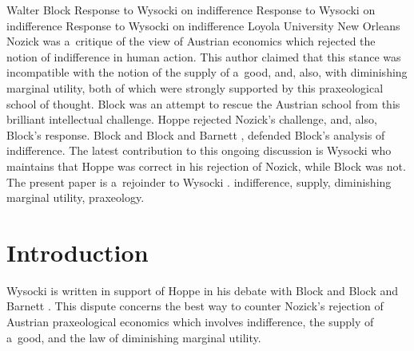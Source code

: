 \begin{artengenv}{Walter Block}
	{Response to Wysocki on indifference\footnotemark{}}
	{Response to Wysocki on indifference}
	{Response to Wysocki on indifference}
	{Loyola University New Orleans}
	{Nozick
	\parencite*{nozick_austrian_1977}
	was a~critique of the view of Austrian economics which rejected the notion of indifference in human action. This author claimed that this stance was incompatible with the notion of the supply of a~good, and, also, with diminishing marginal utility, both of which were strongly supported by this praxeological school of thought. Block
	\parencite*{block_pu1}
	was an attempt to rescue the Austrian school from this brilliant intellectual challenge. Hoppe
	\parencites*{hoppe_pu1}{hoppe_further_2009}
	rejected Nozick's challenge, and, also, Block's
	\parencite*{block_pu1}
	response. Block
	\parencite*{block_rejoinder_2009}
	and Block and Barnett
	\parencite*{block_rejoinder_2010},
	defended Block's
	\parencite*{block_pu1}
	analysis of indifference. The latest contribution to this ongoing discussion is Wysocki
	\parencite*{wysocki_problem_2021}
	who maintains that Hoppe was correct in his rejection of Nozick, while Block was not. The present paper is a~rejoinder to Wysocki
	\parencite*{wysocki_problem_2021}.
	}
	{indifference, supply, diminishing marginal utility, praxeology.}



\section{Introduction}
\lettrine[loversize=0.13,lines=2,lraise=-0.01,nindent=0em,findent=0.2pt]%
{W}{}ysocki
\parencite*[][]{wysocki_problem_2021} %
 is written in support of Hoppe 
\parencites*[][]{hoppe_pu1}[][]{hoppe_further_2009} %
 in his debate with Block 
\parencite*[][]{block_rejoinder_2009} %
 and Block and Barnett 
\parencite*[][]{block_rejoinder_2010}. %
 This dispute concerns the best way to counter Nozick's 
\parencite*[][]{nozick_austrian_1977} %
 rejection of Austrian praxeological economics which involves indifference, the supply of a~good, and the law of diminishing marginal utility.


\end{artengenv}
